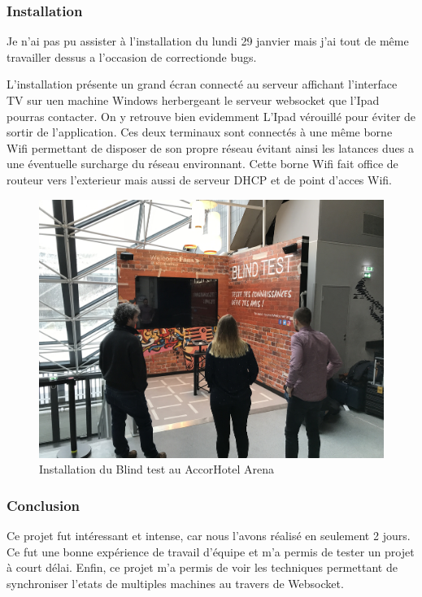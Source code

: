 \subsubsection{Installation}

Je n'ai pas pu assister à l'installation du lundi 29 janvier mais j'ai tout de même travailler dessus a l'occasion de correctionde bugs.

L'installation présente un grand écran connecté au serveur affichant l'interface TV sur uen machine Windows herbergeant le serveur websocket que l'Ipad pourras contacter.
On y retrouve bien evidemment L'Ipad vérouillé pour éviter de sortir de l'application.
Ces deux terminaux sont connectés à une même borne Wifi permettant de disposer de son propre réseau évitant ainsi les latances dues a une éventuelle surcharge du réseau environnant.
Cette borne Wifi fait office de routeur vers l'exterieur mais aussi de serveur DHCP et de point d'acces Wifi.

\begin{figure}[h]
    \centering
    \includegraphics[scale=0.15]{img/accorhotel-blindtest-resize.jpg}
    \caption{Installation du Blind test au AccorHotel Arena}
\end{figure}

\subsubsection{Conclusion}

Ce projet fut intéressant et intense, car nous l'avons réalisé en seulement 2 jours.
Ce fut une bonne expérience de travail d'équipe et m'a permis de tester un projet à court délai.
Enfin, ce projet m'a permis de voir les techniques permettant de synchroniser l'etats de multiples machines au travers de Websocket.